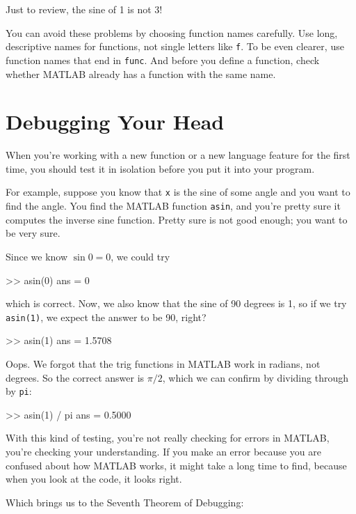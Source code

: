 Just to review, the sine of 1 is not 3!

You can avoid these problems by choosing function names carefully. Use long, descriptive names for functions, not single letters like {\tt f}. To be even clearer, use function names that end in {\tt func}. And before you define a function, check whether MATLAB already has a function with the same name.

\section{Debugging Your Head}

When you're working with a new function or a new language feature
for the first time, you should test it in isolation before you
put it into your program.


For example, suppose you know that {\tt x} is the sine of some
angle and you want to find the angle.  You find the MATLAB function
{\tt asin}, and you're pretty sure it computes the inverse sine
function.  Pretty sure is not good enough; you want to be very sure.

Since we know $\sin 0 = 0$, we could try

\begin{code}
>> asin(0)
ans = 0
\end{code}

which is correct.  Now, we also know that the sine of 90 degrees is
1, so if we try {\tt asin(1)}, we expect the answer to be 90, right?

\begin{code}
>> asin(1)
ans = 1.5708
\end{code}

Oops.  We forgot that the trig functions in MATLAB work in radians,
not degrees.  So the correct answer is $\pi/2$, which we can
confirm by dividing through by {\tt pi}:

\begin{code}
>> asin(1) / pi
ans = 0.5000
\end{code}

With this kind of testing, you're not really checking for
errors in MATLAB, you're checking your understanding.  If you
make an error because you are confused about how MATLAB works, it
might take a long time to find, because when you look at the code,
it looks right.


Which brings us to the Seventh Theorem of Debugging:

